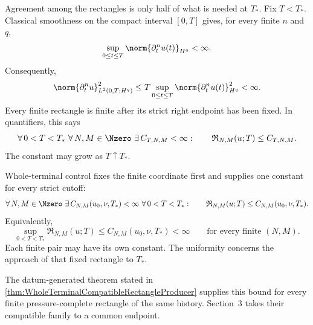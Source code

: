 Agreement among the rectangles is only half of what is needed at \(T_*\).
Fix \(T<T_*\).
Classical smoothness on the compact interval \([0,T]\) gives, for every finite \(n\) and \(q\),
\[
  \sup_{0\leq t\leq T}
  \norm{\partial_t^n u(t)}_{H^q}
  <
  \infty.
\]
Consequently,
\[
  \norm{\partial_t^n u}_{L^2(0,T;H^q)}^2
  \leq
  T
  \sup_{0\leq t\leq T}
  \norm{\partial_t^n u(t)}_{H^q}^2
  <
  \infty.
\]
Every finite rectangle is finite after its strict right endpoint has been fixed.
In quantifiers, this says
\[
  \forall\,0<T<T_*
  \ \forall\,N,M\in\Nzero
  \ \exists\,C_{T,N,M}<\infty:
  \qquad
  \mathfrak R_{N,M}(u;T)
  \leq
  C_{T,N,M}.
\]
The constant may grow as \(T\uparrow T_*\).

Whole-terminal control fixes the finite coordinate first and supplies one constant for every strict cutoff:
\[
  \forall\,N,M\in\Nzero
  \ \exists\,C_{N,M}(u_0,\nu,T_*)<\infty
  \ \forall\,0<T<T_*:
  \qquad
  \mathfrak R_{N,M}(u;T)
  \leq
  C_{N,M}(u_0,\nu,T_*).
\]
Equivalently,
\[
  \sup_{0<T<T_*}
  \mathfrak R_{N,M}(u;T)
  \leq
  C_{N,M}(u_0,\nu,T_*)
  <
  \infty
  \qquad
  \text{for every finite }(N,M).
\]
Each finite pair may have its own constant.
The uniformity concerns the approach of that fixed rectangle to \(T_*\).

The datum-generated theorem stated in \cref{thm:WholeTerminalCompatibleRectangleProducer} supplies this bound for every finite pressure-complete rectangle of the same history.
Section~3 takes their compatible family to a common endpoint.
